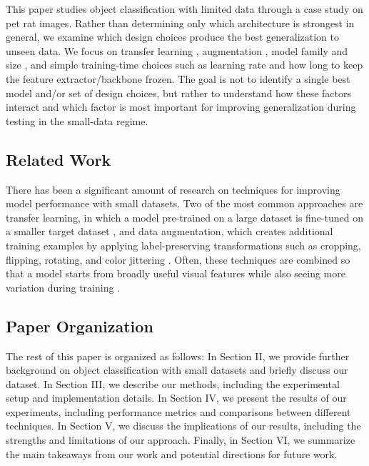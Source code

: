 \documentclass[conference]{IEEEtran}
\begin{document}
This paper studies object classification with limited data through a case study on pet rat images. Rather than determining only which architecture is strongest in general, we examine which design choices produce the best generalization to unseen data. We focus on transfer learning \cite{pan2010transfer}, augmentation \cite{shorten2019augmentation}, model family and size \cite{he2016resnet, howard2017mobilenets, tan2019efficientnet}, and simple training-time choices such as learning rate and how long to keep the feature extractor/backbone frozen. The goal is not to identify a single best model and/or set of design choices, but rather to understand how these factors interact and which factor is most important for improving generalization during testing in the small-data regime.

\subsection{Related Work}
There has been a significant amount of research on techniques for improving model performance with small datasets. Two of the most common approaches are transfer learning, in which a model pre-trained on a large dataset is fine-tuned on a smaller target dataset \cite{pan2010transfer}, and data augmentation, which creates additional training examples by applying label-preserving transformations such as cropping, flipping, rotating, and color jittering \cite{shorten2019augmentation}. Often, these techniques are combined so that a model starts from broadly useful visual features while also seeing more variation during training \cite{pan2010transfer, shorten2019augmentation}.

\subsection{Paper Organization}
The rest of this paper is organized as follows: In Section II, we provide further background on object classification with small datasets and briefly discuss our dataset. In Section III, we describe our methods, including the experimental setup and implementation details. In Section IV, we present the results of our experiments, including performance metrics and comparisons between different techniques. In Section V, we discuss the implications of our results, including the strengths and limitations of our approach. Finally, in Section VI, we summarize the main takeaways from our work and potential directions for future work.
\end{document}
